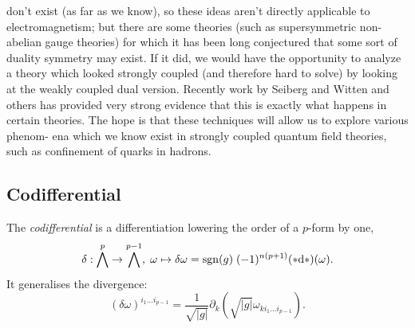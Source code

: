 don’t exist (as far as we know), so these ideas aren’t directly applicable to electromagnetism;
but there are some theories (such as supersymmetric non-abelian gauge theories) for which
it has been long conjectured that some sort of duality symmetry may exist. If it did, we
would have the opportunity to analyze a theory which looked strongly coupled (and therefore
hard to solve) by looking at the weakly coupled dual version. Recently work by Seiberg and
Witten and others has provided very strong evidence that this is exactly what happens in
certain theories. The hope is that these techniques will allow us to explore various phenom-
ena which we know exist in strongly coupled quantum field theories, such as confinement of
quarks in hadrons.


\subsection{Codifferential}
The \emph{codifferential} is a differentiation lowering the order of a $p$-form by one,
\begin{equation}
	\delta:\bigwedge^p \rightarrow \bigwedge^{p-1},\; \omega \mapsto \delta \omega = \mathrm{sgn}(g)\; (-1)^{n(p+1)} (*\mathrm{d} *)(\omega).
\end{equation}
It generalises the divergence:
\begin{equation}
	(\delta \omega)^{i_1 \dots i_{p-1}} = \frac{1}{\sqrt{|g|}} \partial_k \left(\sqrt{|g|} \omega_{k i_1 \dots i_{p-1}}\right).
\end{equation}


